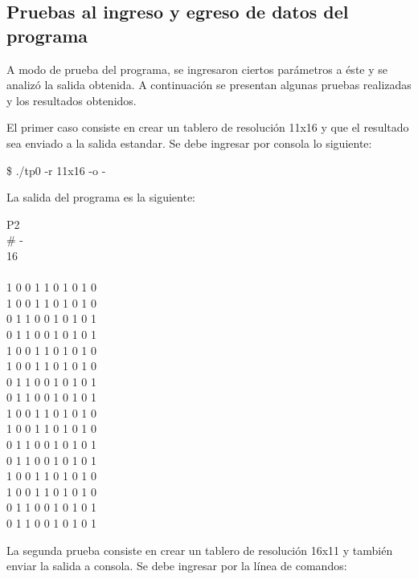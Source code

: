 \documentclass{article}
\begin{document}
\subsection{Pruebas al ingreso y egreso de datos del programa}
\medskip

	A modo de prueba del programa, se ingresaron ciertos parámetros a éste y se analizó la salida obtenida. A continuación se presentan algunas pruebas realizadas y los resultados obtenidos.
	\par
	El primer caso consiste en crear un tablero de resolución 11x16 y que el resultado sea enviado a la salida estandar. Se debe ingresar por consola lo siguiente:
	\bigskip

{\ttfamily\footnotesize
\indent \$ ./tp0 -r 11x16 -o -\\}
\smallskip

	La salida del programa es la siguiente:
	\bigskip

{\ttfamily\footnotesize
	\indent P2 \\
	\indent \# - \\
	 16 \\
	 \\
	 1 0 0 1 1 0 1 0 1 0 \\
	 1 0 0 1 1 0 1 0 1 0 \\
	 0 1 1 0 0 1 0 1 0 1 \\ 
	 0 1 1 0 0 1 0 1 0 1 \\ 
	 1 0 0 1 1 0 1 0 1 0 \\ 
	 1 0 0 1 1 0 1 0 1 0 \\ 
	 0 1 1 0 0 1 0 1 0 1 \\ 
	 0 1 1 0 0 1 0 1 0 1 \\ 
	 1 0 0 1 1 0 1 0 1 0 \\ 
	 1 0 0 1 1 0 1 0 1 0 \\ 
	 0 1 1 0 0 1 0 1 0 1 \\ 
	 0 1 1 0 0 1 0 1 0 1 \\ 
	 1 0 0 1 1 0 1 0 1 0 \\ 
	 1 0 0 1 1 0 1 0 1 0 \\ 
	 0 1 1 0 0 1 0 1 0 1 \\ 
	 0 1 1 0 0 1 0 1 0 1 \\ 
}
\bigskip


	La segunda prueba consiste en crear un tablero de resolución 16x11 y también enviar la salida a consola. Se debe ingresar por la línea de comandos:
	\bigskip
\end{document}
